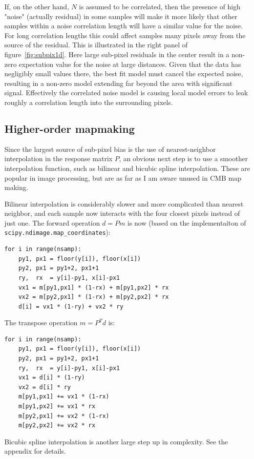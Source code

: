 \documentclass{article}
\newcommand{\code}[1]{\texttt{#1}}
\begin{document}
If, on the other hand, $N$ is assumed to be correlated, then the presence of high
"noise" (actually residual) in some samples
will make it more likely that other samples within a noise correlation length will
have a similar value for the noise. For long correlation lengths this could affect samples
many pixels away from the source of the residual. This is illustrated in the right panel
of figure~\ref{fig:subpix1d}. Here large sub-pixel residuals in the center result in a non-zero expectation
value for the noise at large distances. Given that the data has negligibly small values
there, the best fit model must cancel the expected noise, resulting in a non-zero model
extending far beyond the area with significant signal. Effectively the correlated
noise model is causing local model errors to leak roughly a correlation length
into the surrounding pixels.

\subsection{Higher-order mapmaking}
Since the largest source of sub-pixel bias is the use of nearest-neighbor interpolation in
the response matrix $P$, an obvious next step is to use a smoother interpolation function,
such as bilinear and bicubic spline interpolation. These are popular in image processing, but
are as far as I am aware unused in CMB map making.

Bilinear interpolation is considerably slower and more complicated than nearest neighbor,
and each sample now interacts with the four closest pixels instead of just one.
The forward operation $d=Pm$ is now (based on the implementaiton of \code{scipy.ndimage.map\_coordinates}):
\begin{lstlisting}
for i in range(nsamp):
	py1, px1 = floor(y[i]), floor(x[i])
	py2, px1 = py1+2, px1+1
	ry,  rx  = y[i]-py1, x[i]-px1
	vx1 = m[py1,px1] * (1-rx) + m[py1,px2] * rx
	vx2 = m[py2,px1] * (1-rx) + m[py2,px2] * rx
	d[i] = vx1 * (1-ry) + vx2 * ry
\end{lstlisting}
The transpose operation $m=P^Td$ is:
\begin{lstlisting}
for i in range(nsamp):
	py1, px1 = floor(y[i]), floor(x[i])
	py2, px1 = py1+2, px1+1
	ry,  rx  = y[i]-py1, x[i]-px1
	vx1 = d[i] * (1-ry)
	vx2 = d[i] * ry
	m[py1,px1] += vx1 * (1-rx)
	m[py1,px2] += vx1 * rx
	m[py2,px1] += vx2 * (1-rx)
	m[py2,px2] += vx2 * rx
\end{lstlisting}
Bicubic spline interpolation is another large step up in complexity. See the appendix for details.
\end{document}
